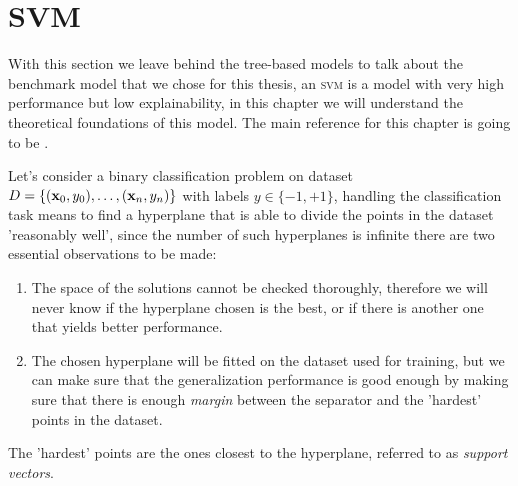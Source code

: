 
\section{SVM}
\label{sec:svm}
With this section we leave behind the tree-based models to talk about the benchmark model that we
chose for this thesis, an \textsc{svm} is a model with very high performance but low explainability,
in this chapter we will understand the theoretical foundations of this model. The main reference for
this chapter is going to be \cite{ZhouZhi-Hua2021ML}.

\medskip

Let's consider a binary classification problem on dataset $D = \{(\mathbf{x}_0, y_0), \ldots, (\mathbf{x}_n, y_n)\}$ with labels $y \in \{-1, +1\}$,
handling the classification task means to find a hyperplane that is able to divide the points in the
dataset 'reasonably well', since the number of such hyperplanes is infinite there are two
essential observations to be made:
\begin{enumerate}
	\item The space of the solutions cannot be checked thoroughly, therefore we will never know
	      if the hyperplane chosen is the best, or if there is another one that yields better
	      performance.
	\item The chosen hyperplane will be fitted on the dataset used for training,
	      but we can make sure that the generalization performance is good enough by making
	      sure that there is enough \emph{margin} between the separator and the 'hardest'
	      points in the dataset.
\end{enumerate}
The 'hardest' points are the ones closest to the hyperplane, referred to as \emph{support
	vectors}.

\medskip

